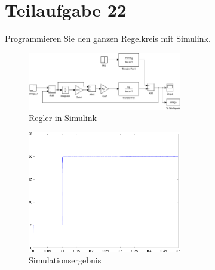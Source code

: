 \section{Teilaufgabe 22}
\begin{aufgabe}
    Programmieren Sie den ganzen Regelkreis mit Simulink.
\end{aufgabe}
\begin{figure}[h!]
    \centering
    \includegraphics[width=0.6\textwidth]{22/regler_pi.pdf}
    \caption{Regler in Simulink}
    \label{fig:22}
\end{figure}
\begin{figure}[h!]
    \centering
    \includegraphics[width=0.6\textwidth]{22/regler_pi_plot.pdf}
    \caption{Simulationsergebnis}
    \label{fig:22plot}
\end{figure}

